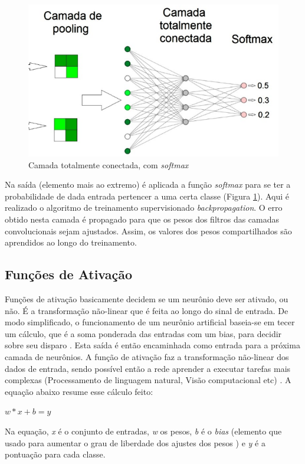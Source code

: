 \begin{figure}
    \centering
    \includegraphics[scale=0.3]{Relatorio/figuras/full_conected.png}
    \caption{Camada totalmente conectada, com \textit{softmax} \cite{eliveltoebermamrenatoa.krohling2018}}
    \label{fig:full}
\end{figure}

Na saída (elemento mais ao extremo) é aplicada a função \textit{softmax} para se ter a probabilidade de dada entrada pertencer a uma certa classe (Figura \ref{fig:full}). Aqui é realizado o algoritmo de treinamento supervisionado \textit{backpropagation}. O erro obtido nesta camada é propagado para que os pesos dos filtros das camadas convolucionais sejam ajustados. Assim, os valores dos pesos compartilhados são aprendidos ao longo do treinamento.


\subsection{Funções de Ativação}

Funções de ativação basicamente decidem se um neurônio deve ser ativado, ou não. É a transformação não-linear que é feita ao longo do sinal de entrada. De modo simplificado, o funcionamento de um neurônio artificial baseia-se em tecer um cálculo, que é a soma ponderada das entradas com um bias, para decidir sobre seu disparo \cite{santos2018identificaccao}. Esta saída é então encaminhada como entrada para a próxima camada de neurônios. A função de ativação faz a transformação não-linear dos dados de entrada, sendo possível então a rede aprender a executar tarefas mais complexas (Processamento de linguagem natural, Visão computacional etc) \cite{haykin2007redes}. A equação abaixo resume esse cálculo feito:
\begin{center}
$w\ast x + b = y$    
\end{center}
Na equação, \textit{x} é o conjunto de  entradas, \textit{w} os pesos, \textit{b} é o \textit{bias} (elemento que usado para aumentar o grau de liberdade dos ajustes dos pesos \cite{haykin2007redes}) e \textit{y} é a pontuação para cada classe.

